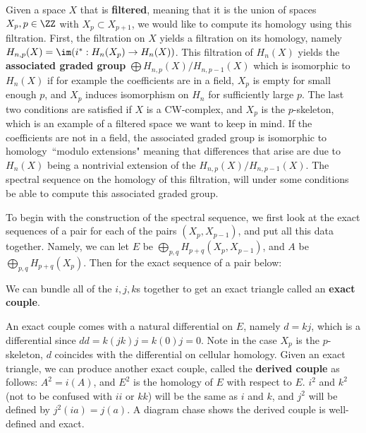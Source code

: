 \documentclass[12pt,oneside]{amsart}
\begin{document}
Given a space $X$ that is \textbf{filtered}, meaning that it is the union of spaces $X_p, p \in \ZZ$ with $X_p \subset X_{p+1}$, we would like to compute its homology using this filtration. First, the filtration on $X$ yields a filtration on its homology, namely $H_{n,p}(X) = \im(i^*:H_n(X_p) \to H_n(X))$. This filtration of $H_n(X)$ yields the \textbf{associated graded group} $\bigoplus H_{n,p}(X)/H_{n,p-1}(X)$ which is isomorphic to $H_n(X)$ if for example the coefficients are in a field, $X_p$ is empty for small enough $p$, and $X_p$ induces isomorphism on $H_n$ for sufficiently large $p$. The last two conditions are satisfied if $X$ is a CW-complex, and $X_p$ is the $p$-skeleton, which is an example of a filtered space we want to keep in mind. If the coefficients are not in a field, the associated graded group is isomorphic to homology\ ``modulo extensions" meaning that differences that arise are due to $H_n(X)$ being a nontrivial extension of the $H_{n,p}(X)/H_{n,p-1}(X)$. The spectral sequence on the homology of this filtration, will under some conditions be able to compute this associated graded group.

To begin with the construction of the spectral sequence, we first look at the exact sequences of a pair for each of the pairs $(X_p,X_{p-1})$, and put all this data together. Namely, we can let $E$ be $\bigoplus_{p,q} H_{p+q}(X_p,X_{p-1})$, and $A$ be $\bigoplus_{p,q} H_{p+q}(X_p)$. Then for the exact sequence of a pair below:
\begin{center}
\end{center}

We can bundle all of the $i,j,k$s together to get an exact triangle called an \textbf{exact couple}.
\begin{center}
\end{center}

An exact couple comes with a natural differential on $E$, namely $d = kj$, which is a differential since $dd = k(jk)j = k(0)j = 0$. Note in the case $X_p$ is the $p$-skeleton, $d$ coincides with the differential on cellular homology. Given an exact triangle, we can produce another exact couple, called the \textbf{derived couple} as follows: $A^2 = i(A)$, and $E^2$ is the homology of $E$ with respect to $E$. $i^2$ and $k^2$ (not to be confused with $ii$ or $kk$) will be the same as $i$ and $k$, and $j^2$ will be defined by $j^2(ia) = j(a)$. A diagram chase shows the derived couple is well-defined and exact. 
\end{document}
